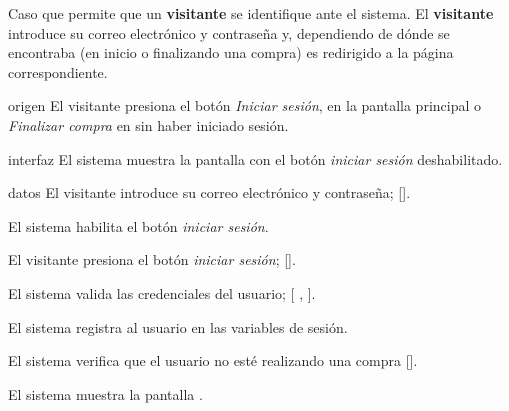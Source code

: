 %
%

{
  Caso que permite que un \textbf{visitante} se identifique ante el sistema. El
  \textbf{visitante} introduce su correo electrónico y contraseña y,
  dependiendo de dónde se encontraba (en inicio o finalizando una compra) es
  redirigido a la página correspondiente.

  \begin{trayectoriaPrincipal}

    \item[origen] El visitante presiona el botón \textit{Iniciar sesión}, en
      la pantalla principal  o
      \textit{Finalizar compra} en  sin
      haber iniciado sesión.

    \item[interfaz] El sistema muestra la pantalla
       con el botón \textit{iniciar sesión}
      deshabilitado.

    \item[datos] El visitante introduce su correo electrónico y contraseña;
      [].

    \item El sistema habilita el botón \textit{iniciar sesión}.

    \item El visitante presiona el botón \textit{iniciar sesión};
      [].

    \item El sistema valida las credenciales del usuario; [%
      ,
      ].

    \item El sistema registra al usuario en las variables de sesión.

    \item El sistema verifica que el usuario no esté realizando una compra
      [].

    \item El sistema muestra la pantalla .

  \end{trayectoriaPrincipal}

}
